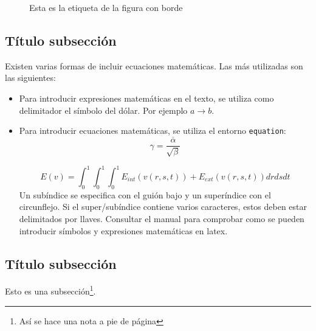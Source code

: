 \begin{figure}[htp]
\begin{center}
\caption{Esta es la etiqueta de la figura con borde}
\label{fig:logo2}
\end{center}
\end{figure}


\subsection{Título subsección}

Existen varias formas de incluir ecuaciones matemáticas. Las más utilizadas son las siguientes:
\begin{itemize}
 \item Para introducir expresiones matemáticas en el texto, se utiliza como delimitador el símbolo del dólar. Por ejemplo $a \rightarrow b$.
 \item Para introducir ecuaciones matemáticas, se utiliza el entorno \texttt{equation}:
\begin{equation}
 \gamma = \frac{\overline{\alpha}}{\sqrt{\beta}}
\label{eq:equation_example_1}
\end{equation}

\begin{equation}
E(v) =  \int^1_0 \int^1_0 \int^1_0 E_{int}(v(r,s,t)) + E_{ext}(v(r,s,t))drdsdt 
\label{eq:equation_example_2}
\end{equation}	
Un subíndice se especifica con el guión bajo y un superíndice con el circunflejo. Si el super/subíndice contiene varios caracteres, estos deben estar delimitados por llaves. Consultar el manual para comprobar como se pueden introducir símbolos y expresiones matemáticas en latex.
\end{itemize}



\subsection{Título subsección}

Esto es una subsección\footnote{Así se hace una nota a pie de página}.


